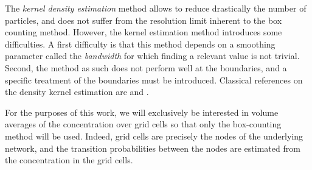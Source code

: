 The \textit{kernel density estimation} method allows to reduce drastically the number of particles, and does not suffer from the resolution limit inherent to the box counting method. However, the kernel estimation method introduces some difficulties. A first difficulty is that this method depends on a smoothing parameter called the \textit{bandwidth} for which finding a relevant value is not trivial. Second, the method as such does not perform well at the boundaries, and a specific treatment of the boundaries must be introduced. Classical references on the density kernel estimation are \cite{silverman1986density} and \cite{wand1995kernel}.

For the purposes of this work, we will exclusively be interested in volume averages of the concentration over grid cells so that only the box-counting method will be used. Indeed, grid cells are precisely the nodes of the underlying network, and the transition probabilities between the nodes are estimated from the concentration in the grid cells.